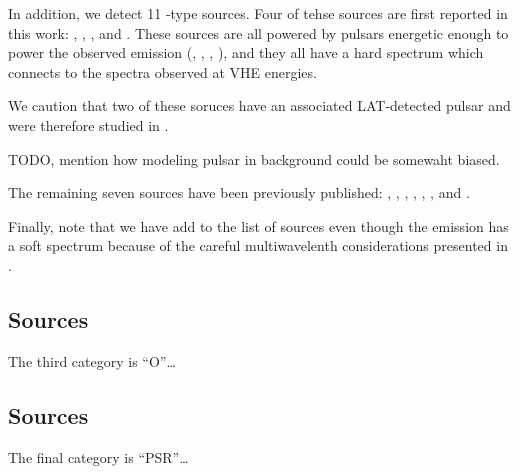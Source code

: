 In addition, we detect 11 \PWNcClass-type sources.  
Four of tehse sources are first reported in this work:
, , , and .
These sources are all powered by pulsars energetic
enough to power the observed emission
(, , , ),
and they all have a hard spectrum which connects to the
spectra observed at \ac{VHE} energies.

We caution that two of these soruces have an associated
LAT-detected pulsar and were therefore studied in .

TODO, mention how modeling pulsar in background could be somewaht biased.



The remaining seven 
sources have been previously published:
 \citep{ackermann_2011_fermi-lat-search},
 \citep{slane_2010a_fermi-detection}, 
\citep{lande_2012_search-spatially}, 
\citep{lande_2012_search-spatially}, 
\citep{lande_2012_search-spatially}, 
\citep{tam_2010a_search-counterparts}, and 
\citep{rousseau_2012a_fermi-lat-constraints}.

Finally, note that we have add  to the list of
\PWNcClass sources even though the \gev emission has a soft spectrum
because of the careful multiwavelenth considerations presented in
\cite{lemoine-goumard_2011a_fermi-lat-detection}.



\subsection{\OtherClass Sources}

The third category is ``O''\ldots

\subsection{\PSRClass Sources}

The final category is ``PSR''\ldots





